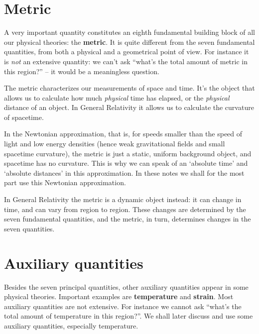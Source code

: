 \documentclass[a4paper,12pt,%
onecolumn,oneside,titlepage,%
british%
]{memoir}
\renewcommand*{\|}[1][]{\nonscript\:#1\vert\nonscript\:\mathopen{}}
\begin{document}
\section{Metric}
\label{sec:metric}

A very important quantity constitutes an eighth fundamental building block of all our physical theories: the \textbf{metric}. It is quite different from the seven fundamental quantities, from both a physical and a geometrical point of view. For instance it is \emph{not} an extensive quantity: we can't ask \enquote{what's the total amount of metric in this region?} -- it would be a meaningless question.

The metric characterizes our measurements of space and time. It's the object that allows us to calculate how much \emph{physical} time has elapsed, or the \emph{physical} distance of an object. In General Relativity it allows us to calculate the curvature of spacetime.

In the Newtonian approximation, that is, for speeds smaller than the speed of light and low energy densities (hence weak gravitational fields and small spacetime curvature), the metric is just a static, uniform background object, and spacetime has no curvature. This is why we can speak of an \enquote*{absolute time} and \enquote*{absolute distances} in this approximation. In these notes we shall for the most part use this Newtonian approximation.

In General Relativity the metric is a dynamic object instead: it can change in time, and can vary from region to region. These changes are determined by the seven fundamental quantities, and the metric, in turn, determines changes in the seven quantities.


\section{Auxiliary quantities}
\label{sec:aux_quantities}

Besides the seven principal quantities, other auxiliary quantities appear in some physical theories. Important examples are \textbf{temperature} and \textbf{strain}. Most auxiliary quantities are not extensive. For instance we cannot ask \enquote{what's the total amount of temperature in this region?}. We shall later discuss and use some auxiliary quantities, especially temperature.
\end{document}
